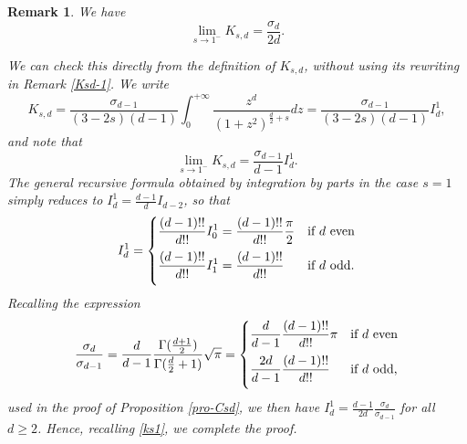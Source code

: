 \documentclass[11pt]{article}
\newtheorem{remark}[definition]{Remark}
\begin{document}
\begin{remark}\rm We have
$$
\lim_{s\to 1^-}K_{s,d}=\frac{\sigma_d}{2d}.
$$

We can check this directly from the definition of $K_{s,d}$, without using its rewriting in Remark \ref{Ksd-1}. We write
$$
K_{s,d}=\frac{\sigma_{d-1}}{(3-2s)(d-1)}\int_0^{+\infty}\frac{z^d}{(1+z^2)^{\frac d2+s}}dz=\frac{\sigma_{d-1}}{(3-2s)(d-1)}I_d^1,
$$
and note that
\begin{equation}\label{ks1}
\lim_{s\to 1^-}K_{s,d}=\frac{\sigma_{d-1}}{d-1}I^1_d. 
\end{equation}
The general recursive formula obtained by integration by parts 
in the case $s=1$ simply reduces to 
$I^1_d=\frac{d-1}{d}I_{d-2}$,
so that 
$$I^1_d=\begin{cases}
\vspace{2mm}
\displaystyle\frac{(d-1)!!}{d!!}I^1_0=\frac{(d-1)!!}{d!!}\frac{\pi}{2} & \hbox{\rm if $d$ even}\\
\vspace{2mm}
\displaystyle\frac{(d-1)!!}{d!!}I^1_1=\frac{(d-1)!!}{d!!} & \hbox{\rm if $d$ odd.}
\end{cases}
$$
Recalling the expression 
$$\frac{\sigma_d}{\sigma_{d-1}}
=\frac{d}{d-1}\frac{\Gamma(\frac{d+1}{2})}{\Gamma(\frac{d}{2}+1)} \sqrt\pi=
\begin{cases}
\vspace{2mm}
\displaystyle \frac{d}{d-1}
\frac{(d-1)!!}{d!!}\pi
& \hbox{\rm if $d$ even}\\
\vspace{2mm}
\displaystyle \frac{2d}{d-1} 
\frac{(d-1)!!}{d!!}
& \hbox{\rm if $d$ odd,}
\end{cases}
$$
used in the proof of Proposition \ref{pro-Csd},
we then have 
$I^1_d=\frac{d-1}{2d}\frac{\sigma_d}{\sigma_{d-1}}$
for all $d\geq 2$.
Hence, recalling \eqref{ks1}, we complete the proof.
\end{remark}





\end{document}
